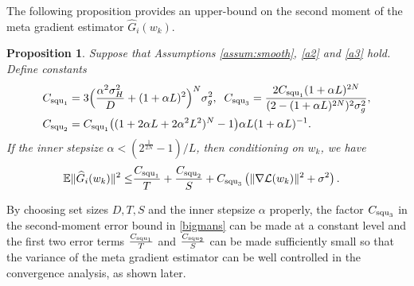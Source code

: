 \documentclass{osudissert96}
\newtheorem{proposition}{Proposition}
\begin{document}
The following proposition provides an upper-bound on the second moment  of the meta gradient estimator $\widehat G_i(w_k)$.
\begin{proposition}\label{th:second} 
	Suppose that Assumptions \ref{assum:smooth}, \ref{a2} and \ref{a3} hold. Define  constants 
 \begin{align}\label{para:seq12}
	C_{\text{\normalfont squ}_1} &= 3\Big(  \frac{\alpha^2 \sigma_H^2}{D} + (1+\alpha L)^2  \Big)^N \sigma_g^2, 	\;\;
	C_{\text{\normalfont squ}_3} =\frac{2C_{\text{\normalfont squ}_1}  (1+\alpha L)^{2N}}{(2- (1+\alpha L)^{2N})^2\sigma_g^2}, \nonumber
	\\       C_{\text{\normalfont squ}_2}  &= C_{\text{\normalfont squ}_1} \big((1+2\alpha L +2\alpha^2L^2)^N-1\big)	\alpha L  (1+\alpha L)^{-1}.
	\end{align}
	If  the inner stepsize $\alpha < (2^{\frac{1}{2N}} - 1)/L$, then conditioning on $w_k$, we have 
	\begin{align}\label{bigmans}
	\mathbb{E}\|\widehat G_i(w_k)\|^2 \leq& \frac{	C_{\text{\normalfont squ}_1}}{T} + \frac{	C_{\text{\normalfont squ}_2} }{S} +	C_{\text{\normalfont squ}_3} \left(  \|\nabla \mathcal{L}(w_k)\|^2 +\sigma^2   \right).
	\end{align}
\end{proposition}
By choosing set sizes $D,T,S$ and the inner stepsize $\alpha$ properly, the factor $C_{\text{\normalfont squ}_3}$ in the second-moment error bound in \cref{bigmans} can be made at a constant level and the first two error terms $\frac{C_{\text{\normalfont squ}_1}}{T} $ and $ \frac{C_{\text{\normalfont squ}_2} }{S}$ can be made sufficiently small so that the variance of the meta gradient estimator can be well controlled in the convergence analysis, as shown later. 
\end{document}
